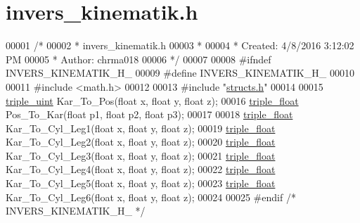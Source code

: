 \hypertarget{invers__kinematik_8h_source}{}\section{invers\+\_\+kinematik.\+h}
\label{invers__kinematik_8h_source}

\begin{DoxyCode}
00001 \textcolor{comment}{/*}
00002 \textcolor{comment}{ * invers\_kinematik.h}
00003 \textcolor{comment}{ *}
00004 \textcolor{comment}{ * Created: 4/8/2016 3:12:02 PM}
00005 \textcolor{comment}{ *  Author: chrma018}
00006 \textcolor{comment}{ */} 
00007 
00008 \textcolor{preprocessor}{#ifndef INVERS\_KINEMATIK\_H\_}
00009 \textcolor{preprocessor}{#define INVERS\_KINEMATIK\_H\_}
00010 
00011 \textcolor{preprocessor}{#include <math.h>}
00012 
00013 \textcolor{preprocessor}{#include "\hyperlink{structs_8h}{structs.h}"}
00014 
00015 \hyperlink{structtriple__uint}{triple\_uint} Kar\_To\_Pos(\textcolor{keywordtype}{float} x, \textcolor{keywordtype}{float} y, \textcolor{keywordtype}{float} z);
00016 \hyperlink{structtriple__float}{triple\_float} Pos\_To\_Kar(\textcolor{keywordtype}{float} p1, \textcolor{keywordtype}{float} p2, \textcolor{keywordtype}{float} p3);
00017 
00018 \hyperlink{structtriple__float}{triple\_float} Kar\_To\_Cyl\_Leg1(\textcolor{keywordtype}{float} x, \textcolor{keywordtype}{float} y, \textcolor{keywordtype}{float} z);
00019 \hyperlink{structtriple__float}{triple\_float} Kar\_To\_Cyl\_Leg2(\textcolor{keywordtype}{float} x, \textcolor{keywordtype}{float} y, \textcolor{keywordtype}{float} z);
00020 \hyperlink{structtriple__float}{triple\_float} Kar\_To\_Cyl\_Leg3(\textcolor{keywordtype}{float} x, \textcolor{keywordtype}{float} y, \textcolor{keywordtype}{float} z);
00021 \hyperlink{structtriple__float}{triple\_float} Kar\_To\_Cyl\_Leg4(\textcolor{keywordtype}{float} x, \textcolor{keywordtype}{float} y, \textcolor{keywordtype}{float} z);
00022 \hyperlink{structtriple__float}{triple\_float} Kar\_To\_Cyl\_Leg5(\textcolor{keywordtype}{float} x, \textcolor{keywordtype}{float} y, \textcolor{keywordtype}{float} z);
00023 \hyperlink{structtriple__float}{triple\_float} Kar\_To\_Cyl\_Leg6(\textcolor{keywordtype}{float} x, \textcolor{keywordtype}{float} y, \textcolor{keywordtype}{float} z);
00024 
00025 \textcolor{preprocessor}{#endif }\textcolor{comment}{/* INVERS\_KINEMATIK\_H\_ */}\textcolor{preprocessor}{}
\end{DoxyCode}
